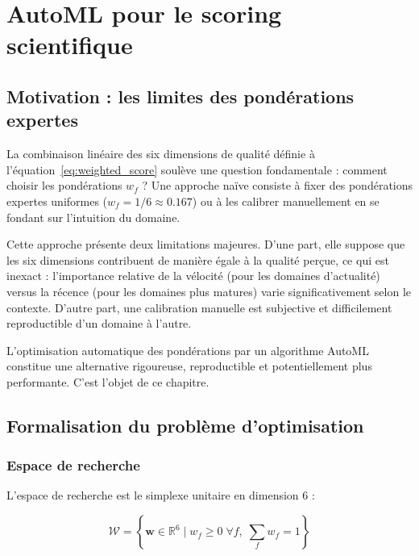 \chapter{AutoML pour le scoring scientifique}
\label{ch:automl}

\section{Motivation : les limites des pondérations expertes}

La combinaison linéaire des six dimensions de qualité définie à
l'équation~\ref{eq:weighted_score} soulève une question fondamentale :
comment choisir les pondérations $w_f$ ? Une approche naïve consiste
à fixer des pondérations expertes uniformes ($w_f = 1/6 \approx 0.167$)
ou à les calibrer manuellement en se fondant sur l'intuition du domaine.

Cette approche présente deux limitations majeures. D'une part, elle suppose
que les six dimensions contribuent de manière égale à la qualité perçue,
ce qui est inexact : l'importance relative de la vélocité (pour les domaines
d'actualité) versus la récence (pour les domaines plus matures) varie
significativement selon le contexte. D'autre part, une calibration manuelle
est subjective et difficilement reproductible d'un domaine à l'autre.

L'optimisation automatique des pondérations par un algorithme AutoML
constitue une alternative rigoureuse, reproductible et potentiellement
plus performante. C'est l'objet de ce chapitre.

\section{Formalisation du problème d'optimisation}

\subsection{Espace de recherche}

L'espace de recherche est le simplexe unitaire en dimension 6 :

\begin{equation}
  \mathcal{W} = \left\{ \mathbf{w} \in \mathbb{R}^6 \mid
    w_f \geq 0 \;\forall f,\; \sum_{f} w_f = 1 \right\}
  \label{eq:simplex}
\end{equation}

